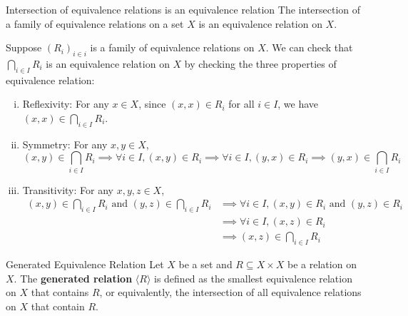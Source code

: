 \begin{proposition}{Intersection of equivalence relations is an equivalence relation}{}
    The intersection of a family of equivalence relations on a set $X$ is an equivalence relation on $X$.
\end{proposition}

\begin{prf}
    Suppose $(R_i)_{i\in i}$ is a family of equivalence relations on $X$. We can check that $\bigcap\limits_{i\in I}R_i$ is an equivalence relation on $X$ by checking the three properties of equivalence relation:
    \begin{enumerate}[(i)]
        \item Reflexivity: For any $x\in X$, since $(x,x)\in R_i$ for all $i\in I$, we have $(x,x)\in \bigcap\limits_{i\in I}R_i$.
        \item Symmetry: For any $x,y\in X$,
        \[
            (x,y)\in \bigcap\limits_{i\in I}R_i\implies\forall i\in I,(x,y)\in R_i\implies\forall i\in I, (y,x)\in R_i\implies(y,x)\in \bigcap\limits_{i\in I}R_i
        \]
        \item Transitivity: For any $x,y,z\in X$,
        \begin{align*}
            (x,y)\in \bigcap\limits_{i\in I}R_i\text{ and }(y,z)\in \bigcap\limits_{i\in I}R_i
            &\implies\forall i\in I,(x,y)\in R_i\text{ and }(y,z)\in R_i\\
            &\implies\forall i\in I, (x,z)\in R_i\\
            &\implies(x,z)\in \bigcap\limits_{i\in I}R_i
        \end{align*}
    \end{enumerate}
\end{prf}


\begin{definition}{Generated Equivalence Relation}{}
    Let $X$ be a set and $R\subseteq X\times X$ be a relation on $X$. The \textbf{generated relation} $\langle R \rangle$ is defined as the smallest equivalence relation on $X$ that contains $R$, or equivalently, the intersection of all equivalence relations on $X$ that contain $R$.
\end{definition}


